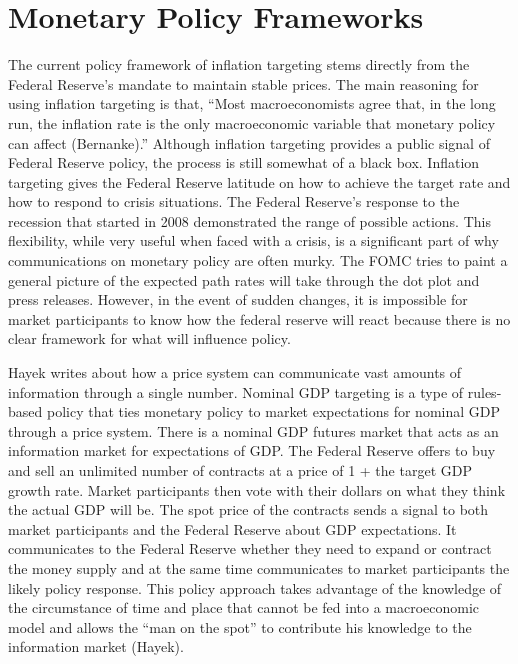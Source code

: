 \documentclass[11pt,]{article}
\begin{document}
\section{Monetary Policy Frameworks}\label{monetary-policy-frameworks}

The current policy framework of inflation targeting stems directly from
the Federal Reserve's mandate to maintain stable prices. The main
reasoning for using inflation targeting is that, ``Most macroeconomists
agree that, in the long run, the inflation rate is the only
macroeconomic variable that monetary policy can affect (Bernanke).''
Although inflation targeting provides a public signal of Federal Reserve
policy, the process is still somewhat of a black box. Inflation
targeting gives the Federal Reserve latitude on how to achieve the
target rate and how to respond to crisis situations. The Federal
Reserve's response to the recession that started in 2008 demonstrated
the range of possible actions. This flexibility, while very useful when
faced with a crisis, is a significant part of why communications on
monetary policy are often murky. The FOMC tries to paint a general
picture of the expected path rates will take through the dot plot and
press releases. However, in the event of sudden changes, it is
impossible for market participants to know how the federal reserve will
react because there is no clear framework for what will influence
policy.

Hayek writes about how a price system can communicate vast amounts of
information through a single number. Nominal GDP targeting is a type of
rules-based policy that ties monetary policy to market expectations for
nominal GDP through a price system. There is a nominal GDP futures
market that acts as an information market for expectations of GDP. The
Federal Reserve offers to buy and sell an unlimited number of contracts
at a price of 1 + the target GDP growth rate. Market participants then
vote with their dollars on what they think the actual GDP will be. The
spot price of the contracts sends a signal to both market participants
and the Federal Reserve about GDP expectations. It communicates to the
Federal Reserve whether they need to expand or contract the money supply
and at the same time communicates to market participants the likely
policy response. This policy approach takes advantage of the knowledge
of the circumstance of time and place that cannot be fed into a
macroeconomic model and allows the ``man on the spot'' to contribute his
knowledge to the information market (Hayek).
\end{document}
